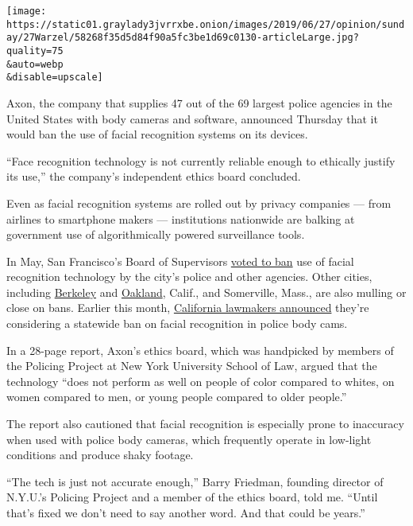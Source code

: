 \texttt{[image: https://static01.graylady3jvrrxbe.onion/images/2019/06/27/opinion/sunday/27Warzel/58268f35d5d84f90a5fc3be1d69c0130-articleLarge.jpg?quality=75\\\&auto=webp\\\&disable=upscale]}

Axon, the company that supplies 47 out of the 69 largest police agencies
in the United States with body cameras and software, announced Thursday
that it would ban the use of facial recognition systems on its devices.

``Face recognition technology is not currently reliable enough to
ethically justify its use,'' the company's independent ethics board
concluded.

Even as facial recognition systems are rolled out by privacy companies
--- from airlines to smartphone makers --- institutions nationwide are
balking at government use of algorithmically powered surveillance tools.

In May, San Francisco's Board of Supervisors
\href{https://www.nytimes3xbfgragh.onion/2019/05/14/us/facial-recognition-ban-san-francisco.html?module=inline}{voted
to ban} use of facial recognition technology by the city's police and
other agencies. Other cities, including
\href{https://www.govtech.com/public-safety/Oakland-Berkeley-Might-Follow-SFs-Facial-Recognition-Ban.html}{Berkeley}
and
\href{https://twitter.com/matt_cagle/status/1143725978293698565?s=12}{Oakland},
Calif., and Somerville, Mass., are also mulling or close on bans.
Earlier this month,
\href{https://www.latimes.com/business/technology/la-fi-tn-face-recognition-ban-california-police-body-camera-20190607-story.html}{California
lawmakers announced} they're considering a statewide ban on facial
recognition in police body cams.

In a 28-page report, Axon's ethics board, which was handpicked by
members of the Policing Project at New York University School of Law,
argued that the technology ``does not perform as well on people of color
compared to whites, on women compared to men, or young people compared
to older people.''

The report also cautioned that facial recognition is especially prone to
inaccuracy when used with police body cameras, which frequently operate
in low-light conditions and produce shaky footage.

``The tech is just not accurate enough,'' Barry Friedman, founding
director of N.Y.U.'s Policing Project and a member of the ethics board,
told me. ``Until that's fixed we don't need to say another word. And
that could be years.''

